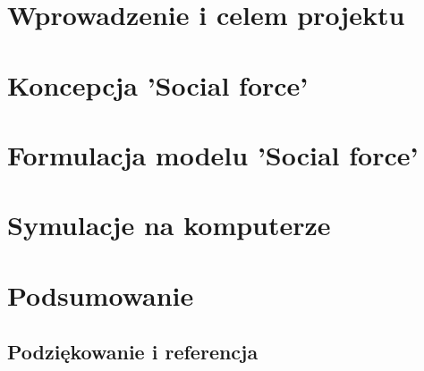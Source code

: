 \documentclass[12pt, a4paper]{report}
\begin{document}
\clearpage 

\clearpage
\chapter{Wprowadzenie i celem projektu}

\chapter{Koncepcja 'Social force'}

\chapter{Formulacja modelu 'Social force'}

\chapter{Symulacje na komputerze}

\chapter{Podsumowanie}

\section*{Podziękowanie i referencja}

\tableofcontents
\end{document}
